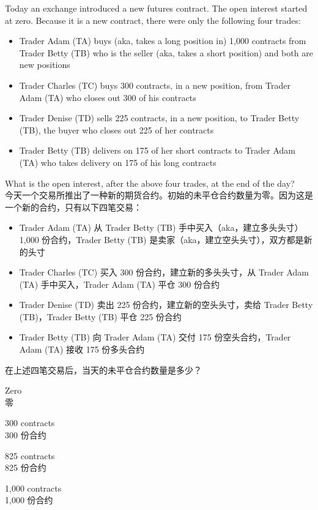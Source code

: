 \documentclass{article}
\newcounter{question} %
\begin{document}
\begin{question}
    Today an exchange introduced a new futures contract. The open interest started at zero. Because it is a new contract, there were only the following four trades:
    \begin{itemize}
        \item Trader Adam (TA) buys (aka, takes a long position in) 1,000 contracts from Trader Betty (TB) who is the seller (aka, takes a short position) and both are new positions
        \item Trader Charles (TC) buys 300 contracts, in a new position, from Trader Adam (TA) who closes out 300 of his contracts
        \item Trader Denise (TD) sells 225 contracts, in a new position, to Trader Betty (TB), the buyer who closes out 225 of her contracts
        \item Trader Betty (TB) delivers on 175 of her short contracts to Trader Adam (TA) who takes delivery on 175 of his long contracts
    \end{itemize}
    What is the open interest, after the above four trades, at the end of the day?
    \\今天一个交易所推出了一种新的期货合约。初始的未平仓合约数量为零。因为这是一个新的合约，只有以下四笔交易：
    \begin{itemize}
        \item Trader Adam (TA) 从 Trader Betty (TB) 手中买入（aka，建立多头头寸）1,000 份合约，Trader Betty (TB) 是卖家（aka，建立空头头寸），双方都是新的头寸
        \item Trader Charles (TC) 买入 300 份合约，建立新的多头头寸，从 Trader Adam (TA) 手中买入，Trader Adam (TA) 平仓 300 份合约
        \item Trader Denise (TD) 卖出 225 份合约，建立新的空头头寸，卖给 Trader Betty (TB)，Trader Betty (TB) 平仓 225 份合约
        \item Trader Betty (TB) 向 Trader Adam (TA) 交付 175 份空头合约，Trader Adam (TA) 接收 175 份多头合约
    \end{itemize}
    在上述四笔交易后，当天的未平仓合约数量是多少？
\end{question}

\begin{choices}
    \item Zero
    \\零
    \item 300 contracts
    \\300 份合约
    \item 825 contracts
    \\825 份合约
    \item 1,000 contracts
    \\1,000 份合约
\end{choices}
\end{document}
